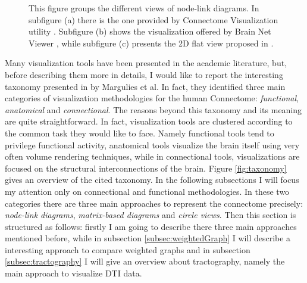 \documentclass{article}
\begin{document}
\begin{multicols}{2}
\begin{figure}[ht]
	\caption{This figure groups the different views of node-link diagrams. In subfigure (a) there is the one provided by Connectome Visualization utility \cite{connectomeVisualizationUtility}. Subfigure (b) shows the visualization offered by Brain Net Viewer \cite{brainNetViewer}, while subfigure (c) presents the 2D flat view proposed in \cite{salvador2005undirected}.}
\end{figure}


Many visualization tools have been presented in the academic literature, but, before describing them more in details, I would like to report the interesting taxonomy presented in \cite{visualizingHumanConnectome} by Margulies et al. In fact, they identified three main categories of visualization methodologies for the human Connectome: \textit{functional}, \textit{anatomical} and \textit{connectional}. The reasons beyond this taxonomy and its meaning are quite straightforward. In fact, visualization tools are clustered according to the common task they would like to face. Namely functional tools tend to privilege functional activity, anatomical tools visualize the brain itself using very often volume rendering techniques, while in connectional tools, visualizations are focused on the structural interconnections of the brain. Figure \ref{fig:taxonomy} gives an overview of the cited taxonomy. In the following subsections I will focus my attention only on connectional and functional methodologies. In these two categories there are three main approaches to represent the connectome precisely: \textit{node-link diagrams}, \textit{matrix-based diagrams} and \textit{circle views}. Then this section is structured as follows: firstly I am going to describe there three main approaches mentioned before, while in subsection \ref{subsec:weightedGraph} I will describe a interesting approach to compare weighted graphs and in subsection \ref{subsec:tractography} I will give an overview about tractography, namely the main approach to visualize DTI data.



\end{multicols}
\end{document}
